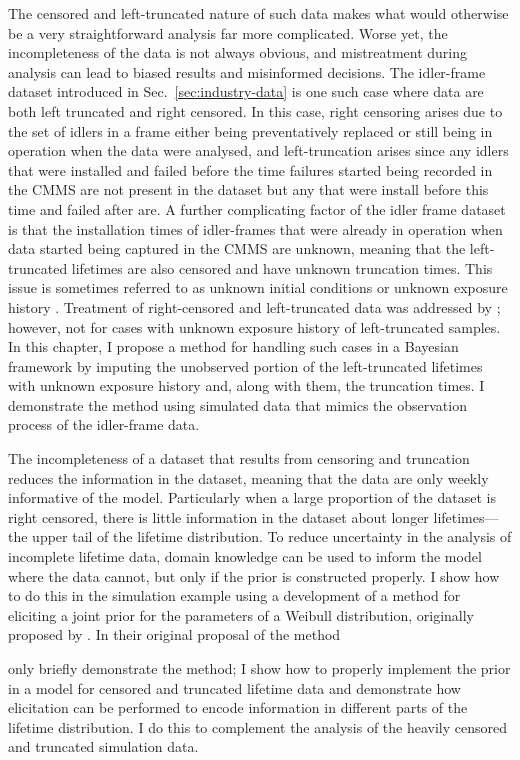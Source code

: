 The censored and left-truncated nature of such data makes what would otherwise be a very straightforward analysis far more complicated. Worse yet, the incompleteness of the data is not always obvious, and mistreatment during analysis can lead to biased results and misinformed decisions. The idler-frame dataset introduced in Sec.~\ref{sec:industry-data} is one such case where data are both left truncated and right censored. In this case, right censoring arises due to the set of idlers in a frame either being preventatively replaced or still being in operation when the data were analysed, and left-truncation arises since any idlers that were installed and failed before the time failures started being recorded in the CMMS are not present in the dataset but any that were install before this time and failed after are. A further complicating factor of the idler frame dataset is that the installation times of idler-frames that were already in operation when data started being captured in the CMMS are unknown, meaning that the left-truncated lifetimes are also censored and have unknown truncation times. This issue is sometimes referred to as unknown initial conditions or unknown exposure history \citep{guo1993}. Treatment of right-censored and left-truncated data was addressed by \citet{hong2009}; however, not for cases with unknown exposure history of left-truncated samples. In this chapter, I propose a method for handling such cases in a Bayesian framework by imputing the unobserved portion of the left-truncated lifetimes with unknown exposure history and, along with them, the truncation times. I demonstrate the method using simulated data that mimics the observation process of the idler-frame data.

The incompleteness of a dataset that results from censoring and truncation reduces the information in the dataset, meaning that the data are only weekly informative of the model. Particularly when a large proportion of the dataset is right censored, there is little information in the dataset about longer lifetimes---the upper tail of the lifetime distribution. To reduce uncertainty in the analysis of incomplete lifetime data, domain knowledge can be used to inform the model where the data cannot, but only if the prior is constructed properly. 
I show how to do this in the simulation example using a development of a method for eliciting a joint prior for the parameters of a Weibull distribution, originally proposed by \citet{kaminskiy2005}. In their original proposal of the method \author{kaminskiy2005} only briefly demonstrate the method; I show how to properly implement the prior in a model for censored and truncated lifetime data and demonstrate how elicitation can be performed to encode information in different parts of the lifetime distribution. I do this to complement the analysis of the heavily censored and truncated simulation data.

